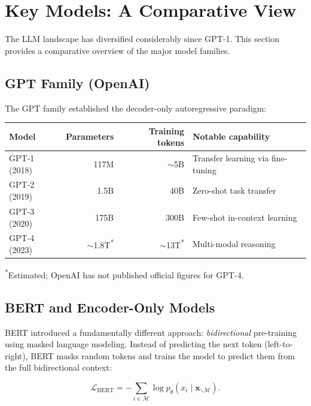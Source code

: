\section{Key Models: A Comparative View}
\label{sec:key-models}

The LLM landscape has diversified considerably since GPT-1. This section provides a comparative overview of the major model families.

\subsection{GPT Family (OpenAI)}

The GPT family established the decoder-only autoregressive paradigm:

\begin{center}
\renewcommand{\arraystretch}{1.12}
\begin{tabularx}{0.92\textwidth}{l r r Y}
\toprule
\textbf{Model} & \textbf{Parameters} & \textbf{Training tokens} & \textbf{Notable capability} \\
\midrule
GPT-1 (2018)  & 117M   & $\sim$5B    & Transfer learning via fine-tuning \\
GPT-2 (2019)  & 1.5B   & 40B         & Zero-shot task transfer \\
GPT-3 (2020)  & 175B   & 300B        & Few-shot in-context learning \\
GPT-4 (2023)  & $\sim$1.8T\textsuperscript{*} & $\sim$13T\textsuperscript{*} & Multi-modal reasoning \\
\bottomrule
\end{tabularx}
\end{center}
\vspace{-0.3em}
{\small \textsuperscript{*}Estimated; OpenAI has not published official figures for GPT-4.}

\subsection{BERT and Encoder-Only Models}

BERT \citep{devlin2019} introduced a fundamentally different approach: \emph{bidirectional} pre-training using masked language modeling. Instead of predicting the next token (left-to-right), BERT masks random tokens and trains the model to predict them from the full bidirectional context:

\begin{equation}
\mathcal{L}_{\text{BERT}} = -\sum_{i \in \mathcal{M}} \log p_\theta(x_i \mid \mathbf{x}_{\backslash \mathcal{M}}).
\label{eq:bert-loss}
\end{equation}

